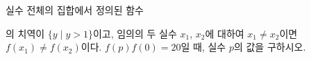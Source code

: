 \hspace*{2mm}\begin{minipage}[t]{\dimexpr\linewidth-2mm\relax}\vspace{0pt}
실수 전체의 집합에서 정의된 함수 \par\smallskip{}\par\smallskip\noindent 의 치역이 $\{y \mid y>1\}$이고, 임의의 두 실수 $x_1$, $x_2$에 대하여 $x_1\ne x_2$이면 $f(x_1)\ne f(x_2)$이다. $f(p)f(0)=20$일 때, 실수 $p$의 값을 구하시오. \end{minipage}
